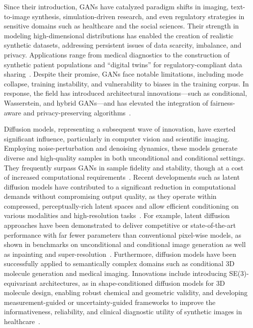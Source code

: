 \documentclass[sigconf]{acmart}
\begin{document}
Since their introduction, GANs have catalyzed paradigm shifts in imaging, text-to-image synthesis, simulation-driven research, and even regulatory strategies in sensitive domains such as healthcare and the social sciences. Their strength in modeling high-dimensional distributions has enabled the creation of realistic synthetic datasets, addressing persistent issues of data scarcity, imbalance, and privacy. Applications range from medical diagnostics to the construction of synthetic patient populations and ``digital twins'' for regulatory-compliant data sharing~\cite{ref74,ref90,ref91,ref92,ref94,ref99}. Despite their promise, GANs face notable limitations, including mode collapse, training instability, and vulnerability to biases in the training corpus. In response, the field has introduced architectural innovations---such as conditional, Wasserstein, and hybrid GANs---and has elevated the integration of fairness-aware and privacy-preserving algorithms~\cite{ref75,ref94,ref98,ref99}.

Diffusion models, representing a subsequent wave of innovation, have exerted significant influence, particularly in computer vision and scientific imaging. Employing noise-perturbation and denoising dynamics, these models generate diverse and high-quality samples in both unconditional and conditional settings. They frequently surpass GANs in sample fidelity and stability, though at a cost of increased computational requirements~\cite{ref82,ref96,ref97,ref101}. Recent developments such as latent diffusion models have contributed to a significant reduction in computational demands without compromising output quality, as they operate within compressed, perceptually-rich latent spaces and allow efficient conditioning on various modalities and high-resolution tasks~\cite{ref100,ref102}. For example, latent diffusion approaches have been demonstrated to deliver competitive or state-of-the-art performance with far fewer parameters than conventional pixel-wise models, as shown in benchmarks on unconditional and conditional image generation as well as inpainting and super-resolution~\cite{ref100}. Furthermore, diffusion models have been successfully applied to semantically complex domains such as conditional 3D molecule generation and medical imaging. Innovations include introducing SE(3)-equivariant architectures, as in shape-conditioned diffusion models for 3D molecule design, enabling robust chemical and geometric validity, and developing measurement-guided or uncertainty-guided frameworks to improve the informativeness, reliability, and clinical diagnostic utility of synthetic images in healthcare~\cite{ref74,ref91,ref102}.
\end{document}
